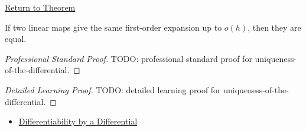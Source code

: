 \newpage
{}
\label{prf:uniqueness-of-the-differential}

\begin{remark*}[Return]
\hyperref[thm:uniqueness-of-the-differential]{Return to Theorem}
\end{remark*}

\begin{theorem*}
If two linear maps give the same first-order expansion up to $o(h)$, then they are equal.
\end{theorem*}

\begin{proof}[Professional Standard Proof]
\LRAProofBodyStart
TODO: professional standard proof for uniqueness-of-the-differential.
\end{proof}

\begin{proof}[Detailed Learning Proof]
\LRAProofBodyStart
TODO: detailed learning proof for uniqueness-of-the-differential.
\end{proof}

\begin{remark*}
\end{remark*}

\begin{dependencies}
\begin{itemize}
  \item \hyperref[def:differentiability-by-a-differential]{Differentiability by a Differential}
\end{itemize}
\end{dependencies}

\clearpage
